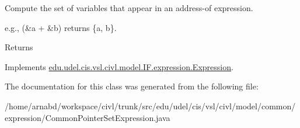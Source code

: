 Compute the set of variables that appear in an address-\/of expression. 

e.\+g., {\ttfamily (\&a + \&b)} returns {\ttfamily \{a, b\}}.

\begin{DoxyReturn}{Returns}

\end{DoxyReturn}


Implements \hyperlink{interfaceedu_1_1udel_1_1cis_1_1vsl_1_1civl_1_1model_1_1IF_1_1expression_1_1Expression_ac2ad0236534bec54b91ee78ff658cbe0}{edu.\+udel.\+cis.\+vsl.\+civl.\+model.\+I\+F.\+expression.\+Expression}.



The documentation for this class was generated from the following file\+:\begin{DoxyCompactItemize}
\item 
/home/arnabd/workspace/civl/trunk/src/edu/udel/cis/vsl/civl/model/common/expression/Common\+Pointer\+Set\+Expression.\+java\end{DoxyCompactItemize}
